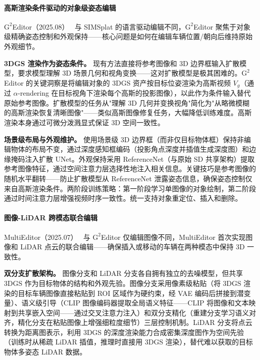 \paragraph{高斯渲染条件驱动的对象级姿态编辑}

$\text{G}^2$Editor（2025.08）~\cite{2508_20471} 与 SIMSplat 的语言驱动编辑不同，$\text{G}^2$Editor 聚焦于对象级精确姿态控制和外观保持——核心问题是如何在编辑车辆位置/朝向后维持原始外观细节。

\textbf{3DGS 渲染作为姿态条件。} 现有方法直接将参考图像和 3D 边界框输入扩散模型，要求模型理解 3D 场景几何和视角变换——这对扩散模型是极其困难的。$\text{G}^2$Editor 的关键洞察是将编辑对象的 3DGS 资产按目标位姿渲染为高斯视频 $V_g$（通过 $\alpha$-rendering 在目标视角下渲染每个高斯的投影图像），以此作为条件输入替代原始参考图像。扩散模型的任务从"理解 3D 几何并变换视角"简化为"从略微模糊的高斯渲染恢复清晰图像"——类似高斯图像修复任务，大幅降低训练难度。高斯渲染本身通过可微分泼溅显式保证 3D 空间一致性。

\textbf{场景级布局与外观维护。} 使用场景级 3D 边界框（而非仅目标物体框）保持非编辑物体的布局不变，通过深度感知框编码（投影角点深度并插值生成深度图）和边缘掩码注入扩散 UNet。外观保持采用 ReferenceNet（与原始 SD 共享架构）提取参考图像特征，通过空间注意力层选择性地注入相关信息。关键技巧是参考图像的随机水平翻转——防止扩散模型从 ReferenceNet 泄露姿态信息，确保姿态控制仅来自高斯渲染条件。两阶段训练策略：第一阶段学习单图像的对象绘制，第二阶段通过时间注意力层增强视频时序一致性。统一支持对象重定位、插入和删除。

\paragraph{图像-LiDAR 跨模态联合编辑}

MultiEditor（2025.07）~\cite{2507_21872} 与 $\text{G}^2$Editor 仅编辑图像不同，MultiEditor 首次实现图像和 LiDAR 点云的联合编辑——确保插入或移动的车辆在两种模态中保持 3D 一致性。

\textbf{双分支扩散架构。} 图像分支和 LiDAR 分支各自拥有独立的去噪模型，但共享 3DGS 作为目标物体的结构和外观先验。图像分支采用像素级粘贴（将 3DGS 渲染的目标车辆图像直接粘贴到 ROI 区域作为硬约束，经 VAE 编码后拼接到潜变量）、语义级引导（CLIP 图像编码器提取全局语义特征——CLIP 将图像和文本映射到共享嵌入空间——通过交叉注意力注入）和双分支精化（重建分支学习语义对齐，精化分支在粘贴图像上增强细粒度细节）三层控制机制。LiDAR 分支将点云转换为距离图表示，利用 3DGS 的深度渲染能力合成密集深度图作为空间先验（训练时从稀疏 LiDAR 插值，推理时直接用 3DGS 渲染），替代难以获取的目标物体多姿态 LiDAR 数据。

